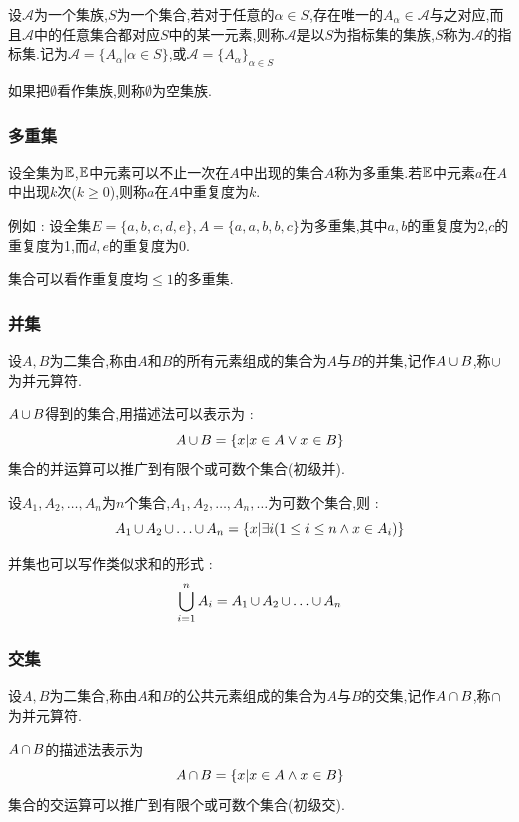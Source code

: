 {{{设$\mathcal{A}$为一个集族,$S$为一个集合,若对于任意的$\alpha \in S$,存在唯一的$A_\alpha \in \mathcal{A}$与之对应,而且$\mathcal{A}$中的任意集合都对应$S$中的某一元素,则称$\mathcal{A}$是以$S$为指标集的集族,$S$称为$\mathcal{A}$的指标集.记为$\mathcal{A} = \{A_\alpha | \alpha \in S\}$,或$\mathcal{A} = \{A_\alpha\}_{\alpha \in S}$

如果把$\emptyset$看作集族,则称$\emptyset$为空集族.
}%

\subsubsection{多重集}{
  设全集为$\mathEverythingCollection$,$\mathEverythingCollection$中元素可以不止一次在$A$中出现的集合$A$称为多重集.若$\mathEverythingCollection$中元素$a$在$A$中出现$k$次($k \geq 0$),则称$a$在$A$中重复度为$k$.

  例如 : 设全集$E = \{a,b,c,d,e\},A = \{a,a,b,b,c\}$为多重集,其中$a,b$的重复度为2,$c$的重复度为1,而$d,e$的重复度为0.

  集合可以看作重复度均$\leq 1$的多重集.
}%

\subsubsection{并集}{
  设$A,B$为二集合,称由$A$和$B$的所有元素组成的集合为$A$与$B$的并集,记作$A \unionSet B$,称$\unionSet$为并元算符.

  $A \unionSet B$得到的集合,用描述法可以表示为 : $$
    A \unionSet B = \{x | x \in A \lor x \in B\}
  $$
  集合的并运算可以推广到有限个或可数个集合(初级并).

  设$A_1,A_2,\dots,A_n$为$n$个集合,$A_1,A_2,\dots,A_n,\dots$为可数个集合,则 : $$
    A_1 \unionSet A_2 \unionSet \dots \unionSet A_n = \{x | \exists i (1 \leq i \leq n \land x \in A_i)\}
  $$

  并集也可以写作类似求和的形式 : $$
    \updownUnion{n}{i = 1}A_i = A_1 \unionSet A_2 \unionSet \dots \unionSet A_n
  $$

}%

\subsubsection{交集}{
  设$A,B$为二集合,称由$A$和$B$的公共元素组成的集合为$A$与$B$的交集,记作$A \intersectionSet B$,称$\intersectionSet$为并元算符.

  $A \intersectionSet B$的描述法表示为$$
    A \intersectionSet B = \{x | x \in A \land x \in B\}
  $$
  集合的交运算可以推广到有限个或可数个集合(初级交).

}}}
